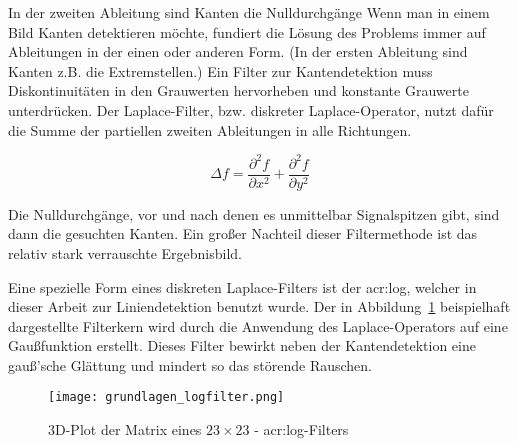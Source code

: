 In der zweiten Ableitung sind Kanten die Nulldurchgänge 
Wenn man in einem Bild Kanten detektieren möchte, fundiert die Lösung des Problems immer auf Ableitungen in der einen oder anderen Form. (In der ersten Ableitung sind Kanten z.B. die Extremstellen.) Ein Filter zur Kantendetektion muss Diskontinuitäten in den Grauwerten hervorheben und konstante Grauwerte unterdrücken. Der Laplace-Filter, bzw. diskreter Laplace-Operator, nutzt dafür die Summe der partiellen zweiten Ableitungen in alle Richtungen. \autocite{jaehneDigitaleBildverarbeitungMit2005}

\begin{equation}
\Delta f = \frac{\partial^2 f}{\partial x^2} + \frac{\partial^2 f}{\partial y^2}
\end{equation}

Die Nulldurchgänge, vor und nach denen es unmittelbar Signalspitzen gibt, sind dann die gesuchten Kanten. Ein großer Nachteil dieser Filtermethode ist das relativ stark verrauschte Ergebnisbild.

Eine spezielle Form eines diskreten Laplace-Filters ist der \gls{acr:log}, welcher in dieser Arbeit zur Liniendetektion benutzt wurde. Der in Abbildung~\ref{fig:grundlagen_logfilter} beispielhaft dargestellte Filterkern wird durch die Anwendung des Laplace-Operators auf eine Gaußfunktion erstellt. Dieses Filter bewirkt neben der Kantendetektion eine gauß'sche Glättung und mindert so das störende Rauschen.

\begin{figure}[H] %
  \centering
  \texttt{[image: grundlagen\_logfilter.png]}
  \caption{3D-Plot der Matrix eines \( 23\times23\) - \gls{acr:log}-Filters}
  \label{fig:grundlagen_logfilter}
\end{figure}  


